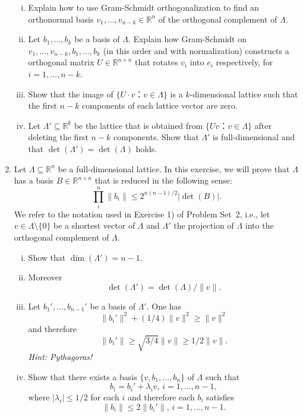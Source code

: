\documentclass[11pt,a4paper]{article}
\begin{document}
\begin{enumerate}[1)]
  \begin{enumerate}[i)] 
  \item Explain how to use Gram-Schmidt orthogonalization to find an
    orthonormal basis $v_1,\dots,v_{n-k}∈ ℝ^n$ of the orthogonal
    complement of $Λ$.
  \item Let $b_1,\dots,b_k$ be a basis of $Λ$. Explain how
    Gram-Schmidt on $v_1,\dots,v_{n-k},b_1,\dots,b_k$ (in this order
    and with normalization) constructs a orthogonal matrix
    $U ∈ ℝ^{ n ×n}$ that rotates $v_i$ into $e_i$ respectively, for
    $i=1,\dots,n-k$.
  \item Show that the image of $\{ U ⋅v ： v ∈ Λ\}$ is a $k$-dimensional lattice such that the first $n-k$ components of each lattice vector are zero.
  \item Let $Λ' ⊆ ℝ^k$ be the lattice that is obtained from $\{ U v ： v ∈ Λ\}$ after deleting the first $n-k$ components. Show that $Λ'$ is full-dimensional and that $\det(Λ') = \det(Λ)$ holds. 
  \end{enumerate}
\item Let $Λ⊆ℝ^n$ be a full-dimensional lattice. In this exercise, we will prove that $Λ$ has a basis $B ∈ℝ^{n ×n}$  that is reduced in the following sense:
  \begin{displaymath}
   ∏_i^n \|b_i\| ≤ 2^{n (n-1)/2}  |\det (B)|.
 \end{displaymath}
 We refer to the notation used in Exercise 1) of Problem Set~2, i.e., let $v ∈Λ \setminus \{0\}$ be a shortest vector of $Λ$ and $Λ'$ the projection of $Λ$ into the orthogonal complement of $Λ$.
 \begin{enumerate}[i)]
 \item Show that $\dim(Λ') = n-1$.
 \item Moreover 
   \begin{displaymath}
     \det(Λ') = \det(Λ) / \|v\|.  
   \end{displaymath}
 \item Let $b_1', \dots , b_{n-1}'$ be a basis of $Λ'$. One has
   \begin{displaymath}
     \| b_i'\| ^2 + (1/4) \|v\|^2 ≥ \|v\|^2
   \end{displaymath}
   and therefore
   \begin{displaymath}
     \| b_i'\|   ≥ \sqrt{3/4}\|v\| ≥ 1/2 \|v\|. 
   \end{displaymath}
   \hfill{\emph{Hint: Pythagoras!}}
    \item Show that there exists a basis $\{v,b_1,\dots,b_n\}$ of $Λ$ such that
   \begin{displaymath}
     b_i = b_i' + λ_i v ,  \,   i=1,\dots,n-1,
   \end{displaymath}
   where $|λ_i | ≤ 1/2$ for each $i$ and therefore each $b_i$ satisfies
   \begin{displaymath}
     \| b_i\|  ≤  2 \| b_i'\|, \, i=1,\dots,n-1.
   \end{displaymath}


\end{enumerate}
\end{enumerate}
\end{document}
